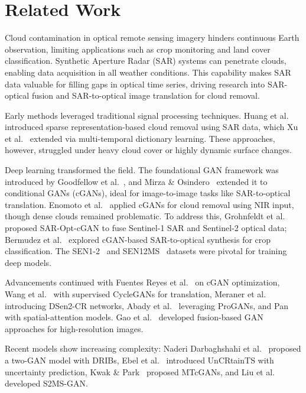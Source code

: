 \section{Related Work}\label{relatedWork}

Cloud contamination in optical remote sensing imagery hinders continuous Earth observation, limiting applications such as crop monitoring and land cover classification. Synthetic Aperture Radar (SAR) systems can penetrate clouds, enabling data acquisition in all weather conditions. This capability makes SAR data valuable for filling gaps in optical time series, driving research into SAR-optical fusion and SAR-to-optical image translation for cloud removal.

Early methods leveraged traditional signal processing techniques. Huang et al.~\cite{huang2015} introduced sparse representation-based cloud removal using SAR data, which Xu et al.~\cite{xu2016} extended via multi-temporal dictionary learning. These approaches, however, struggled under heavy cloud cover or highly dynamic surface changes.

Deep learning transformed the field. The foundational GAN framework was introduced by Goodfellow et al.~\cite{goodfellow2014}, and Mirza \& Osindero~\cite{mirza2014} extended it to conditional GANs (cGANs), ideal for image-to-image tasks like SAR-to-optical translation. Enomoto et al.~\cite{enomoto2017} applied cGANs for cloud removal using NIR input, though dense clouds remained problematic. To address this, Grohnfeldt et al.~\cite{grohnfeldt2018} proposed SAR-Opt-cGAN to fuse Sentinel-1 SAR and Sentinel-2 optical data; Bermudez et al.~\cite{bermudez2018} explored cGAN-based SAR-to-optical synthesis for crop classification. The SEN1-2~\cite{schmitt2018} and SEN12MS~\cite{schmitt2019} datasets were pivotal for training deep models.

Advancements continued with Fuentes Reyes et al.~\cite{fuentes2019} on cGAN optimization, Wang et al.~\cite{wang2019} with supervised CycleGANs for translation, Meraner et al.~\cite{meraner2020} introducing DSen2-CR networks, Abady et al.~\cite{abady2020} leveraging ProGANs, and Pan~\cite{pan2020} with spatial-attention models. Gao et al.~\cite{gao2020} developed fusion-based GAN approaches for high-resolution images.

Recent models show increasing complexity: Naderi Darbaghshahi et al.~\cite{naderi2021} proposed a two-GAN model with DRIBs, Ebel et al.~\cite{ebel2022} introduced UnCRtainTS with uncertainty prediction, Kwak \& Park~\cite{kwak2024} proposed MTcGANs, and Liu et al.~\cite{liu2024} developed S2MS-GAN.

